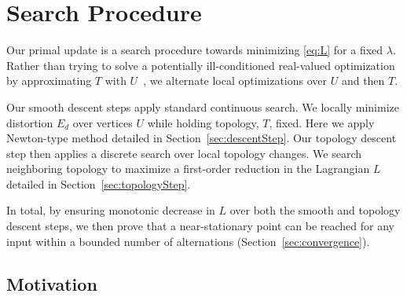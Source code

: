 
\section{Search Procedure}%
\label{sec:DCSearch}


Our primal update is a search procedure towards minimizing \eqref{eq:L} for a fixed $\lambda$. 
Rather than trying to solve a potentially ill-conditioned real-valued optimization by approximating $T$ with $U$\ \cite{Poranne2017Autocuts}, we alternate local optimizations over $U$ and then $T$. 

Our smooth descent steps apply standard continuous search. We locally minimize distortion $E_d$ over vertices $U$ while holding topology, $T$, fixed. Here we apply Newton-type method detailed in Section~\ref{sec:descentStep}.
%
Our topology descent step then applies a discrete search over local topology changes. We search neighboring topology to maximize a first-order reduction in the Lagrangian $L$ detailed in Section~\ref{sec:topologyStep}. 

In total, by ensuring monotonic decrease in $L$ over both the smooth and topology descent steps, we then prove that a near-stationary point can be reached for any input within a bounded number of alternations (Section~\ref{sec:convergence}).  

\subsection{Motivation}


